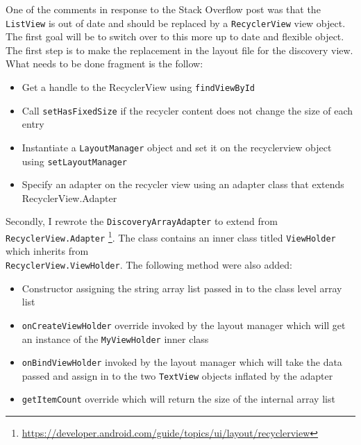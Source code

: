 \documentclass[fontsize=11pt, %
                             paper=a4, %
                             twoside, %
                             captions=tableheading,
                             index=totoc,
                             hyperref]{labbook}
\begin{document}
\begin{addmargin}[0cm]{0cm}
One of the comments in response to the Stack Overflow post was that the \texttt{ListView} is out of date and should be replaced by a \texttt{RecyclerView} view object. The first goal will be to switch over to this more up to date and flexible object. The first step is to make the replacement in the layout file for the discovery view. What needs to be done fragment is the follow:
\begin{itemize}
\item Get a handle to the RecyclerView using \texttt{findViewById}
\item Call \texttt{setHasFixedSize} if the recycler content does not change the size of each entry
\item Instantiate a \texttt{LayoutManager} object and set it on the recyclerview object using \texttt{setLayoutManager}
\item Specify an adapter on the recycler view using an adapter class that extends RecyclerView.Adapter
\end{itemize}
Secondly, I rewrote the \texttt{DiscoveryArrayAdapter} to extend from \texttt{RecyclerView.Adapter} \footnote{\url{https://developer.android.com/guide/topics/ui/layout/recyclerview}}. The class contains an inner class titled \texttt{ViewHolder} which inherits from\\
\texttt{RecyclerView.ViewHolder}. The following method were also added:
\begin{itemize}
\item Constructor assigning the string array list passed in to the class level array list
\item \texttt{onCreateViewHolder} override invoked by the layout manager which will get an instance of the \texttt{MyViewHolder} inner class
\item \texttt{onBindViewHolder} invoked by the layout manager which will take the data passed and assign in to the two \texttt{TextView} objects inflated by the adapter
\item \texttt{getItemCount} override which will return the size of the internal array list 
\end{itemize}


\end{addmargin}
\end{document}
